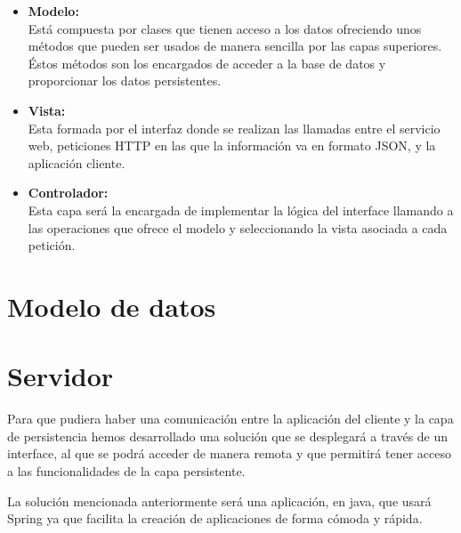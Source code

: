 \begin{itemize}
\item \textbf{Modelo:}\\
Está compuesta por clases que tienen acceso a los datos ofreciendo unos métodos que pueden ser usados de manera sencilla por las capas superiores. Éstos métodos son los encargados de acceder a la base de datos y proporcionar los datos persistentes.



\item \textbf{Vista:}\\
Esta formada por el interfaz donde se realizan las llamadas entre el servicio web, peticiones HTTP en las que la información va en formato JSON, y la aplicación cliente.

\item \textbf{Controlador:}\\
Esta capa será la encargada de implementar la lógica del interface llamando a las operaciones que ofrece el modelo y seleccionando la vista asociada a cada petición.



\end{itemize}


\section{Modelo de datos}

\section{Servidor}

Para que pudiera haber una comunicación entre la aplicación del cliente y la capa de persistencia hemos desarrollado una solución que se desplegará a través de un interface, al que se podrá acceder de manera remota y que permitirá tener acceso a las funcionalidades de la capa persistente.

La solución mencionada anteriormente será una aplicación, en java, que  usará Spring ya que facilita la creación de aplicaciones de forma cómoda y rápida.\\

